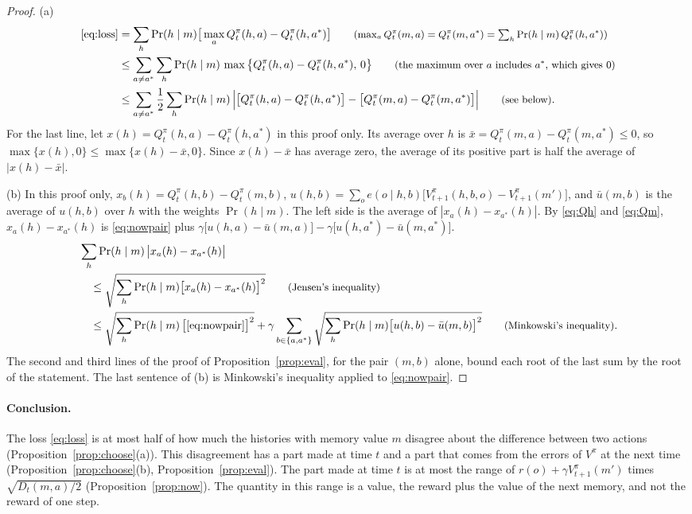 \documentclass{article}
\theoremstyle{definition}
\newcommand{\why}[1]{\tag*{\small(#1)}}
\begin{document}
\begin{proof}
(a)
\begin{align*}
\eqref{eq:loss}&=\sum_h\Pr(h\mid m)\big[\max_aQ^\pi_t(h,a)-Q^\pi_t(h,a^*)\big] \why{$\max_aQ^\pi_t(m,a)=Q^\pi_t(m,a^*)=\sum_h\Pr(h\mid m)\,Q^\pi_t(h,a^*)$}\\
&\le\sum_{a\ne a^*}\sum_h\Pr(h\mid m)\,\max\big\{Q^\pi_t(h,a)-Q^\pi_t(h,a^*),\,0\big\} \why{the maximum over $a$ includes $a^*$, which gives $0$}\\
&\le\sum_{a\ne a^*}\frac12\sum_h\Pr(h\mid m)\,\Big|\big[Q^\pi_t(h,a)-Q^\pi_t(h,a^*)\big]-\big[Q^\pi_t(m,a)-Q^\pi_t(m,a^*)\big]\Big| \why{see below}.
\end{align*}
For the last line, let $x(h)=Q^\pi_t(h,a)-Q^\pi_t(h,a^*)$ in this proof only. Its average over $h$ is $\bar x=Q^\pi_t(m,a)-Q^\pi_t(m,a^*)\le0$, so $\max\{x(h),0\}\le\max\{x(h)-\bar x,0\}$. Since $x(h)-\bar x$ has average zero, the average of its positive part is half the average of $|x(h)-\bar x|$.

(b) In this proof only, $x_b(h)=Q^\pi_t(h,b)-Q^\pi_t(m,b)$, $u(h,b)=\sum_oe(o\mid h,b)\big[V^\pi_{t+1}(h,b,o)-V^\pi_{t+1}(m')\big]$, and $\bar u(m,b)$ is the average of $u(h,b)$ over $h$ with the weights $\Pr(h\mid m)$. The left side is the average of $|x_a(h)-x_{a^*}(h)|$. By \eqref{eq:Qh} and \eqref{eq:Qm}, $x_a(h)-x_{a^*}(h)$ is \eqref{eq:nowpair} plus $\gamma\big[u(h,a)-\bar u(m,a)\big]-\gamma\big[u(h,a^*)-\bar u(m,a^*)\big]$.
\begin{align*}
&\sum_h\Pr(h\mid m)\,\big|x_a(h)-x_{a^*}(h)\big|\\
&\quad\le\sqrt{\sum_h\Pr(h\mid m)\big[x_a(h)-x_{a^*}(h)\big]^2} \why{Jensen's inequality}\\
&\quad\le\sqrt{\sum_h\Pr(h\mid m)\,\big[\eqref{eq:nowpair}\big]^2}+\gamma\sum_{b\in\{a,a^*\}}\sqrt{\sum_h\Pr(h\mid m)\big[u(h,b)-\bar u(m,b)\big]^2} \why{Minkowski's inequality}.
\end{align*}
The second and third lines of the proof of Proposition~\ref{prop:eval}, for the pair $(m,b)$ alone, bound each root of the last sum by the root of the statement. The last sentence of (b) is Minkowski's inequality applied to \eqref{eq:nowpair}.
\end{proof}

\paragraph{Conclusion.} The loss \eqref{eq:loss} is at most half of how much the histories with memory value $m$ disagree about the difference between two actions (Proposition~\ref{prop:choose}(a)). This disagreement has a part made at time $t$ and a part that comes from the errors of $V^\pi$ at the next time (Proposition~\ref{prop:choose}(b), Proposition~\ref{prop:eval}). The part made at time $t$ is at most the range of $r(o)+\gamma V^\pi_{t+1}(m')$ times $\sqrt{D_t(m,a)/2}$ (Proposition~\ref{prop:now}). The quantity in this range is a value, the reward plus the value of the next memory, and not the reward of one step.
\end{document}
